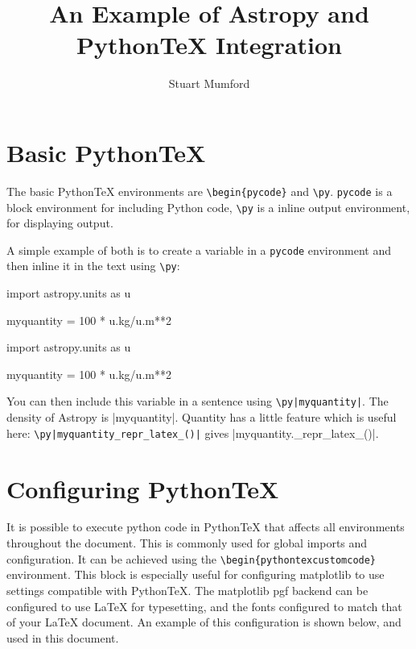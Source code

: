 \documentclass[]{article}
\title{An Example of Astropy and PythonTeX Integration}
\author{Stuart Mumford}
\begin{document}
\maketitle

\section{Basic PythonTeX}

The basic PythonTeX environments are \verb|\begin{pycode}| and \verb|\py|. \verb|pycode| is a block environment for including Python code, \verb|\py| is a inline output environment, for displaying output.

A simple example of both is to create a variable in a \verb|pycode| environment and then inline it in the text using \verb|\py|:

\begin{pyverbatim}
\begin{pycode}
import astropy.units as u

myquantity = 100 * u.kg/u.m**2
\end{pycode}
\end{pyverbatim}

\begin{pycode}
import astropy.units as u

myquantity = 100 * u.kg/u.m**2
\end{pycode}

You can then include this variable in a sentence using \verb~\py|myquantity|~. The density of Astropy is \py|myquantity|. Quantity has a little feature which is useful here: \verb~\py|myquantity_repr_latex_()|~ gives \py|myquantity._repr_latex_()|.

\section{Configuring PythonTeX}

It is possible to execute python code in PythonTeX that affects all environments throughout the document. This is commonly used for global imports and configuration.
It can be achieved using the \verb|\begin{pythontexcustomcode}| environment.
This block is especially useful for configuring matplotlib to use settings compatible with PythonTeX.
The matplotlib pgf backend can be configured to use LaTeX for typesetting, and the fonts configured to match that of your LaTeX document.
An example of this configuration is shown below, and used in this document.
\end{document}
